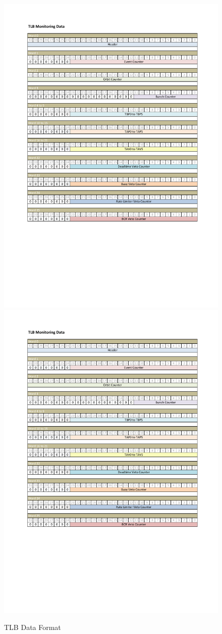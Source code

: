 \begin{figure}[htbp!]
   \centering
    \includegraphics[page=1,width=.8\textwidth, trim={2.0cm 8.0cm 1.7cm 1.8cm}, clip]{Appendix3/TLBdataformat.pdf}
   \includegraphics[page=2,width=.8\textwidth, trim={2.0cm 18.5cm 1.7cm 1.8cm}, clip]{Appendix3/TLBdataformat.pdf}
 \caption{TLB Data Format}
 \label{fig:TLBDataFormatPDF}
\end{figure}



